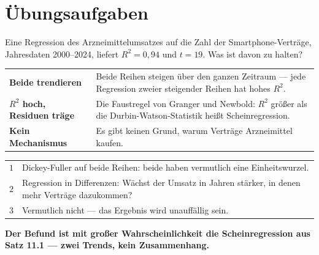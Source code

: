 \section{Übungsaufgaben}

\begin{aufgabe}
Eine Regression des Arzneimittelumsatzes auf die Zahl der Smartphone-Verträge, Jahresdaten 2000--2024, liefert $R^{2} = 0{,}94$ und $t = 19$. Was ist davon zu halten?

\loesung
{}
\begin{center}
{\small
\renewcommand{\arraystretch}{1.5}
\begin{tabular}{@{}P{2.8cm}P{5.8cm}@{}}
\toprule
\textbf{Beide trendieren} & Beide Reihen steigen über den ganzen Zeitraum --- jede Regression zweier steigender Reihen hat hohes $R^{2}$.\\
\textbf{$R^{2}$ hoch, Residuen träge} & Die Faustregel von Granger und Newbold: $R^{2}$ größer als die Durbin-Watson-Statistik heißt Scheinregression.\\
\textbf{Kein Mechanismus} & Es gibt keinen Grund, warum Verträge Arzneimittel kaufen.\\
\bottomrule
\end{tabular}}
\end{center}

\begin{center}
{\small
\renewcommand{\arraystretch}{1.5}
\begin{tabular}{@{}P{1.0cm}P{7.4cm}@{}}
\toprule
$1$ & Dickey-Fuller auf beide Reihen: beide haben vermutlich eine Einheitswurzel.\\
$2$ & Regression in Differenzen: Wächst der Umsatz in Jahren stärker, in denen mehr Verträge dazukommen?\\
$3$ & Vermutlich nicht --- das Ergebnis wird unauffällig sein.\\
\bottomrule
\end{tabular}}
\end{center}

\begin{center}
\begin{minipage}{0.9\textwidth}
\textbf{Der Befund ist mit großer Wahrscheinlichkeit die Scheinregression aus Satz 11.1 --- zwei Trends, kein Zusammenhang.}
\end{minipage}
\end{center}

\begin{center}
\begin{minipage}{0.88\textwidth}
\end{minipage}
\end{center}
\end{aufgabe}

